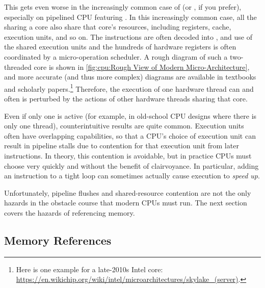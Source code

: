 This gets even worse in the increasingly common case of 
(or , if you prefer), especially on pipelined
CPU featuring .
In this increasingly common case, all the  sharing
a core also share that core's resources, including registers, cache,
execution units, and so on.
The instructions are often decoded into , and use of the
shared execution units and the hundreds of hardware registers is often
coordinated by a micro-operation scheduler.
A rough diagram of such a two-threaded core is shown in
\cref{fig:cpu:Rough View of Modern Micro-Architecture},
and more accurate (and thus more complex) diagrams are available in
textbooks and scholarly papers.\footnote{
	Here is one example for a late-2010s Intel core:
	\url{https://en.wikichip.org/wiki/intel/microarchitectures/skylake_(server)}.}
Therefore, the execution of one hardware thread can and often is perturbed
by the actions of other hardware threads sharing that core.

Even if only one  is active (for example, in old-school
CPU designs where there is only one thread), counterintuitive results
are quite common.
Execution units often have overlapping capabilities, so that a CPU's
choice of execution unit can result in pipeline stalls due to contention
for that execution unit from later instructions.
In theory, this contention is avoidable, but in practice CPUs must choose
very quickly and without the benefit of clairvoyance.
In particular, adding an instruction to a tight loop can sometimes
actually cause execution to \emph{speed up}.

Unfortunately, pipeline flushes and shared-resource contention are not
the only hazards in the obstacle course that modern CPUs must run.
The next section covers the hazards of referencing memory.

\subsection{Memory References}
\label{sec:cpu:Memory References}

